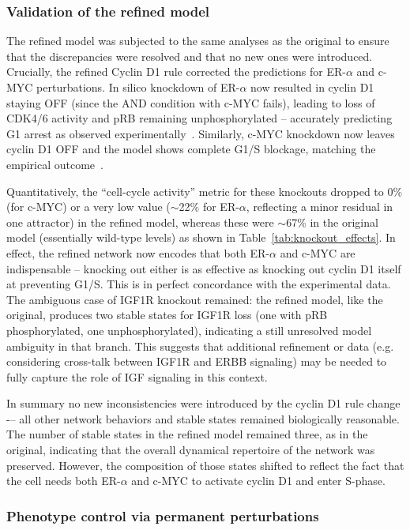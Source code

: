 \documentclass[a4paper,12pt]{article}
\begin{document}
\subsubsection{Validation of the refined model}
The refined model was subjected to the same analyses as the original to ensure that the discrepancies were resolved and that no new ones were introduced. Crucially, the refined Cyclin D1 rule corrected the predictions for ER-$\alpha$ and c-MYC perturbations. In silico knockdown of ER-$\alpha$ now resulted in cyclin D1 staying OFF (since the AND condition with c-MYC fails), leading to loss of CDK4/6 activity and pRB remaining unphosphorylated -- accurately predicting G1 arrest as observed experimentally~\cite{Sahin2009}. Similarly, c-MYC knockdown now leaves cyclin D1 OFF and the model shows complete G1/S blockage, matching the empirical outcome~\cite{Sahin2009}. 

Quantitatively, the ``cell-cycle activity'' metric for these knockouts dropped to 0\% (for c-MYC) or a very low value ($\sim$22\% for ER-$\alpha$, reflecting a minor residual in one attractor) in the refined model, whereas these were $\sim$67\% in the original model (essentially wild-type levels) as shown in Table~\ref{tab:knockout_effects}. In effect, the refined network now encodes that both ER-$\alpha$ and c-MYC are indispensable -- knocking out either is as effective as knocking out cyclin D1 itself at preventing G1/S. This is in perfect concordance with the experimental data.
The ambiguous case of IGF1R knockout remained: the refined model, like the original, produces two stable states for IGF1R loss (one with pRB phosphorylated, one unphosphorylated), indicating a still unresolved model ambiguity in that branch. This suggests that additional refinement or data (e.g. considering cross-talk between IGF1R and ERBB signaling) may be needed to fully capture the role of IGF signaling in this context.

In summary no new inconsistencies were introduced by the cyclin D1 rule change -– all other network behaviors and stable states remained biologically reasonable. The number of stable states in the refined model remained three, as in the original, indicating that the overall dynamical repertoire of the network was preserved. However, the composition of those states shifted to reflect the fact that the cell needs both ER-$\alpha$ and c-MYC to activate cyclin D1 and enter S-phase. 

\subsubsection{Phenotype control via permanent perturbations}
\end{document}
